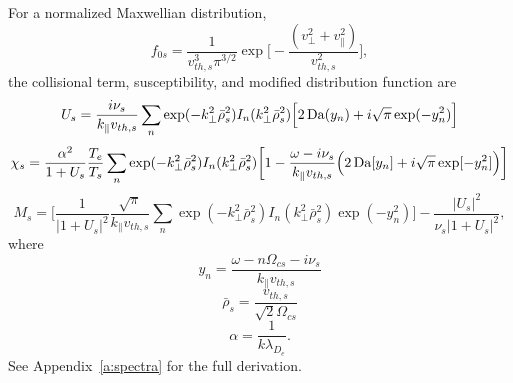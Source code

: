 For a normalized Maxwellian distribution,
\begin{equation}
	f_{0s} = 
	\frac{1}{v_{th,s}^3\pi^{3/2}}
	\exp\bigg[- \frac{(v_\perp^2 + v_\parallel^2)}{v_{th,s}^2} \bigg],
\end{equation}
the collisional term, susceptibility, and modified distribution function are
\begin{equation}
	U_s = 
	\frac{i \nu_{s}}{k_\parallel v_{th,s}} 
	\sum_n \exp(-k_\perp^2 \bar{\rho}_s^2) I_n (k_\perp^2 \bar{\rho}_s^2) 
	\Big[ 2 \operatorname{Da}(y_n) + i \sqrt{\pi} \exp(-y_n^2) \Big]
\end{equation}
\begin{equation}
	\chi_s = 
	\frac{\alpha^2}{1+U_s} \frac{T_e}{T_s} 
	\sum_n \exp(-k_\perp^2 \bar{\rho}_s^2) I_n (k_\perp^2 \bar{\rho}_s^2) 
	\bigg[ 1 - \frac{\omega-i\nu_s}{k_\parallel v_{th,s}} 
	\Big( 2 \operatorname{Da}[y_n] + i \sqrt{\pi} \exp[-y_n^2] \Big)
	\bigg]
\end{equation}
\begin{equation}
	M_s = 
	\Bigg[
	\frac{1}{|1+U_s|^2} \frac{\sqrt{\pi}}{k_\parallel v_{th,s}}
	\sum_n \exp(-k_\perp^2 \bar{\rho}_s^2) I_n (k_\perp^2 \bar{\rho}_s^2) \exp(-y_n^2)
	\Bigg]
	- \frac{|U_s|^2}{\nu_s |1+U_s|^2},
\end{equation}
where
\begin{equation}
	y_n = \frac{\omega-n\Omega_{cs}-i\nu_s}{k_\parallel v_{th,s}}
\end{equation}
\begin{equation}
	\bar{\rho}_s = \frac{v_{th,s}}{\sqrt{2}\Omega_{cs}}
\end{equation}
\begin{equation}
	\alpha = \frac{1}{k \lambda_{D_e}}.
\end{equation}
See Appendix~\ref{a:spectra} for the full derivation.


